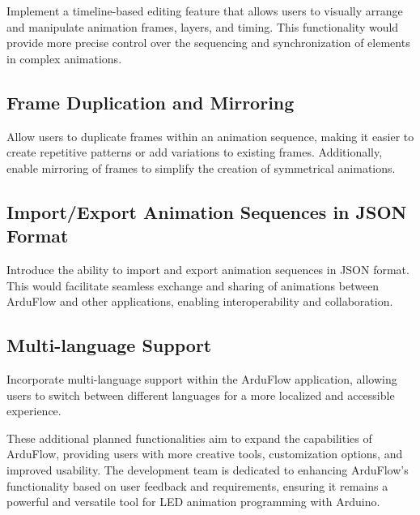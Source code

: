 \documentclass[a4paper, 11pt]{article}
\begin{document}
     Implement a timeline-based editing feature that allows users to visually arrange and manipulate animation frames, layers, and timing. This functionality would provide more precise control over the sequencing and synchronization of elements in complex animations.
    \subsection{Frame Duplication and Mirroring}

     Allow users to duplicate frames within an animation sequence, making it easier to create repetitive patterns or add variations to existing frames. Additionally, enable mirroring of frames to simplify the creation of symmetrical animations.
    \subsection{Import/Export Animation Sequences in JSON Format}

     Introduce the ability to import and export animation sequences in JSON format. This would facilitate seamless exchange and sharing of animations between ArduFlow and other applications, enabling interoperability and collaboration.
    \subsection{Multi-language Support}

    Incorporate multi-language support within the ArduFlow application, allowing users to switch between different languages for a more localized and accessible experience.

\bigbreak
These additional planned functionalities aim to expand the capabilities of ArduFlow, providing users with more creative tools, customization options, and improved usability. The development team is dedicated to enhancing ArduFlow's functionality based on user feedback and requirements, ensuring it remains a powerful and versatile tool for LED animation programming with Arduino.

\pagebreak
\end{document}
